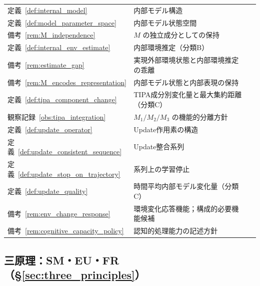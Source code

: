 \begin{longtable}{p{2.4cm} p{10.4cm} r}
定義~\ref{def:internal_model} & 内部モデル構造 & \pageref{def:internal_model} \\
定義~\ref{def:model_parameter_space} & 内部モデル状態空間 & \pageref{def:model_parameter_space} \\
備考~\ref{rem:M_independence} & $M$ の独立成分としての保持 & \pageref{rem:M_independence} \\
定義~\ref{def:internal_env_estimate} & 内部環境推定（分類B） & \pageref{def:internal_env_estimate} \\
備考~\ref{rem:estimate_gap} & 実現外部環境状態と内部環境推定の乖離 & \pageref{rem:estimate_gap} \\
備考~\ref{rem:M_encodes_representation} & 内部モデル状態と内部表現の保持 & \pageref{rem:M_encodes_representation} \\
定義~\ref{def:tipa_component_change} & TIPA成分別変化量と最大集約距離（分類C） & \pageref{def:tipa_component_change} \\
観察記録~\ref{obs:tipa_integration} & $M_1/M_2/M_3$ の機能的分離方針 & \pageref{obs:tipa_integration} \\
定義~\ref{def:update_operator} & Update作用素の構造 & \pageref{def:update_operator} \\
定義~\ref{def:update_consistent_sequence} & Update整合系列 & \pageref{def:update_consistent_sequence} \\
定義~\ref{def:update_stop_on_trajectory} & 系列上の学習停止 & \pageref{def:update_stop_on_trajectory} \\
定義~\ref{def:update_quality} & 時間平均内部モデル変化量（分類C） & \pageref{def:update_quality} \\
備考~\ref{rem:env_change_response} & 環境変化応答機能；構成的必要機能候補 & \pageref{rem:env_change_response} \\
備考~\ref{rem:cognitive_capacity_policy} & 認知的処理能力の記述方針 & \pageref{rem:cognitive_capacity_policy} \\
\end{longtable}
\endgroup

\subsection*{三原理：SM・EU・FR（\S\ref{sec:three_principles}）}

